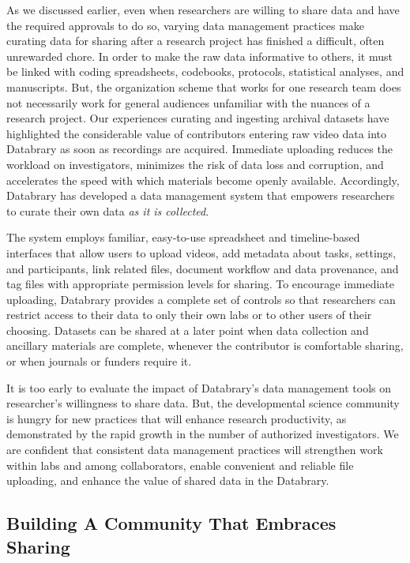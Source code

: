 \documentclass[letterpaper,man,apacite]{apa6}
\begin{document}
As we discussed earlier, even when researchers are willing to share data and have the required approvals to do so, varying data management practices make curating data for sharing after a research project has finished a difficult, often unrewarded chore.
In order to make the raw data informative to others, it must be linked with coding spreadsheets, codebooks, protocols, statistical analyses, and manuscripts.
But, the organization scheme that works for one research team does not necessarily work for general audiences unfamiliar with the nuances of a research project.
Our experiences curating and ingesting archival datasets have highlighted the considerable value of contributors entering raw video data into Databrary as soon as recordings are acquired. 
Immediate uploading reduces the workload on investigators, minimizes the risk of data loss and corruption, and accelerates the speed with which materials become openly available. 
Accordingly, Databrary has developed a data management system that empowers researchers to curate their own data \emph{as it is collected}.

The system employs familiar, easy-to-use spreadsheet and timeline-based interfaces that allow users to upload videos, add metadata about tasks, settings, and participants, link related files, document workflow and data provenance, and tag files with appropriate permission levels for sharing. 
To encourage immediate uploading, Databrary provides a complete set of controls so that researchers can restrict
access to their data to only their own labs or to other users of their choosing. 
Datasets can be shared at a later point when data collection and ancillary materials are complete, whenever the contributor is comfortable sharing, or when journals or funders require it. 

It is too early to evaluate the impact of Databrary's data management tools on researcher's willingness to share data.
But, the developmental science community is hungry for new practices that will enhance research productivity, as demonstrated by the rapid growth in the number of authorized investigators.
We are confident that consistent data management practices will strengthen work within labs and among collaborators, enable convenient and reliable file uploading, and enhance the value of shared data in the Databrary.

\subsection{Building A Community That Embraces Sharing}
\end{document}
